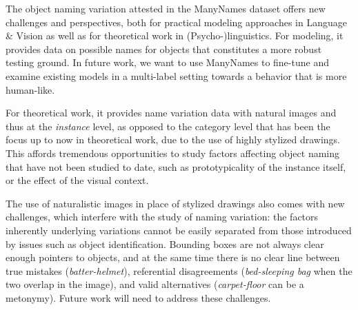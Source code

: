 The object naming variation attested in the ManyNames dataset offers new challenges and perspectives, both for practical modeling approaches in Language \& Vision as well as for theoretical work in (Psycho-)linguistics.
For modeling, it provides data on possible names for objects that constitutes a more robust testing ground.
In future work, we want to use ManyNames to fine-tune and examine  existing models in a multi-label setting towards a behavior that is more human-like. 

For theoretical work, it provides name variation data with natural images and thus at the \textit{instance} level, as opposed to the category level that has been the focus up to now in theoretical work, due to the use of highly stylized drawings.
This affords tremendous opportunities to study factors affecting object naming that have not been studied to date, such as prototypicality of the instance itself, or the effect of the visual context.

The use of naturalistic images in place of stylized drawings also comes with new challenges, which interfere with the study of naming variation: the factors inherently underlying variations cannot be easily separated from those introduced by issues such as object identification.  
Bounding boxes are not always clear enough pointers to objects, and at the same time there is no clear line between true mistakes (\textit{batter-helmet}), referential disagreements (\textit{bed-sleeping bag} when the two overlap in the image), and valid alternatives (\textit{carpet-floor} can be a metonymy).
Future work will need to address these challenges. 


